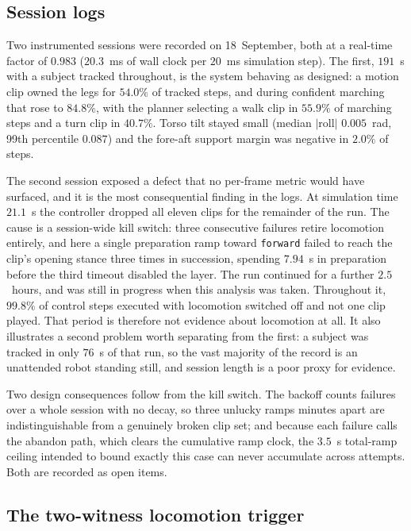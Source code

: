 \documentclass[twocolumn]{article}
\begin{document}
\subsection{Session logs}

Two instrumented sessions were recorded on 18~September, both at a real-time factor of $0.983$
($20.3$~ms of wall clock per $20$~ms simulation step). The first, $191$~s with a subject
tracked throughout, is the system behaving as designed: a motion clip owned the legs for
$54.0\%$ of tracked steps, and during confident marching that rose to $84.8\%$, with the
planner selecting a walk clip in $55.9\%$ of marching steps and a turn clip in $40.7\%$. Torso
tilt stayed small (median $|\mathrm{roll}|$ $0.005$~rad, 99th percentile $0.087$) and the
fore-aft support margin was negative in $2.0\%$ of steps.

The second session exposed a defect that no per-frame metric would have surfaced, and it is the
most consequential finding in the logs. At simulation time $21.1$~s the controller dropped all
eleven clips for the remainder of the run. The cause is a session-wide kill switch: three
consecutive failures retire locomotion entirely, and here a single preparation ramp toward
\texttt{forward} failed to reach the clip's opening stance three times in succession, spending
$7.94$~s in preparation before the third timeout disabled the layer. The run continued for a
further $2.5$~hours, and was still in progress when this analysis was taken. Throughout it,
$99.8\%$ of control steps executed with locomotion switched off and not one clip played. That
period is therefore not evidence about locomotion at all. It also illustrates a second problem
worth separating from the first: a subject was tracked in only $76$~s of that run, so the vast
majority of the record is an unattended robot standing still, and session length is a poor
proxy for evidence.

Two design consequences follow from the kill switch. The backoff counts failures over a whole
session with no decay, so three unlucky ramps minutes apart are indistinguishable from a
genuinely broken clip set; and because each failure calls the abandon path, which clears the
cumulative ramp clock, the $3.5$~s total-ramp ceiling intended to bound exactly this case can
never accumulate across attempts. Both are recorded as open items.

\subsection{The two-witness locomotion trigger}
\end{document}
